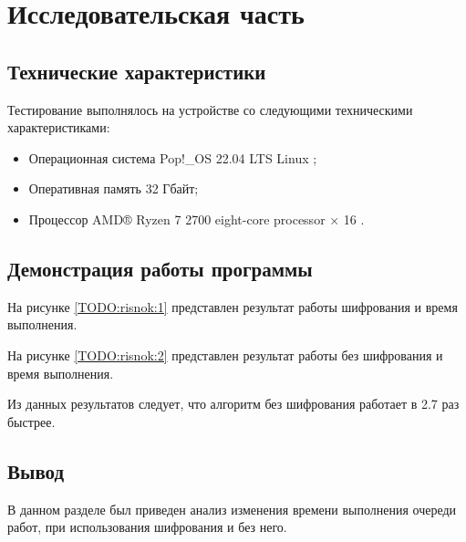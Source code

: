 \section{\large Исследовательская часть}

\subsection{Технические характеристики}

Тестирование выполнялось на устройстве со следующими техническими характеристиками:

\begin{itemize}
	\item Операционная система Pop!\_OS 22.04 LTS \cite{ubuntu} Linux \cite{linux};
	\item Оперативная память 32 Гбайт;
	\item Процессор AMD® Ryzen 7 2700 eight-core processor × 16 \cite{amd}.
\end{itemize}

\subsection{Демонстрация работы программы}

На рисунке \ref{TODO:risnok:1} представлен результат работы шифрования и время выполнения.

\begin{figure}[ht!]
\end{figure}

На рисунке \ref{TODO:risnok:2} представлен результат работы без шифрования и время выполнения.


\begin{figure}[ht!]
\end{figure}


Из данных результатов следует, что алгоритм без шифрования работает в 2.7 раз быстрее.

\subsection*{Вывод}

В данном разделе был приведен анализ изменения времени выполнения очереди работ, 
при использования шифрования и без него.
